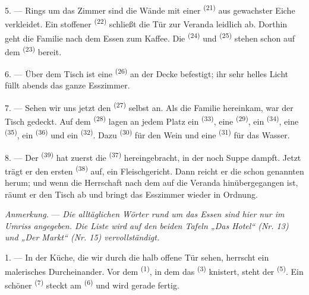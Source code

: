\VUsaut{4.6mm}
\VUsaut{3.0mm}

5. --- Rings um das Zimmer sind die Wände mit einer 
\textsuperscript{(21)} aus gewachster Eiche verkleidet. Ein stoffener
 \textsuperscript{(22)} schließt die Tür zur Veranda leidlich ab.
Dorthin geht die Familie nach dem Essen zum Kaffee. Die 
\textsuperscript{(24)} und  \textsuperscript{(25)} stehen schon
auf dem  \textsuperscript{(23)} bereit.

6. --- Über dem Tisch ist eine  \textsuperscript{(26)} an der
Decke befestigt; ihr sehr helles Licht füllt abends das ganze Esszimmer.

7. --- Sehen wir uns jetzt den  \textsuperscript{(27)} selbst an. Als
die Familie hereinkam, war der Tisch gedeckt. Auf dem 
\textsuperscript{(28)} lagen an jedem Platz ein 
\textsuperscript{(33)}, eine  \textsuperscript{(29)}, ein
 \textsuperscript{(34)}, eine  \textsuperscript{(35)},
ein  \textsuperscript{(36)} und ein 
\textsuperscript{(32)}. Dazu  \textsuperscript{(30)} für den Wein
und eine  \textsuperscript{(31)} für das Wasser.

8. --- Der  \textsuperscript{(39)} hat zuerst die
 \textsuperscript{(37)} hereingebracht, in der noch Suppe
dampft. Jetzt trägt er den ersten  \textsuperscript{(38)} auf, ein
Fleischgericht. Dann reicht er die schon genannten herum; und wenn die Herrschaft
nach dem  auf die Veranda hinübergegangen ist, räumt er den Tisch
ab und bringt das Esszimmer wieder in Ordnung.

\textit{Anmerkung.} --- \textit{Die alltäglichen Wörter rund um das Essen sind hier
nur im Umriss angegeben. Die Liste wird auf den beiden Tafeln „Das Hotel“ (Nr. 13)
und „Der Markt“ (Nr. 15) vervollständigt.}

\VUsaut{4.6mm}
\VUsaut{3.0mm}

1. --- In der Küche, die wir durch die halb offene Tür sehen, herrscht ein
malerisches Durcheinander. Vor dem  \textsuperscript{(1)}, in dem
das  \textsuperscript{(3)} knistert, steht der 
\textsuperscript{(5)}. Ein schöner  \textsuperscript{(7)} steckt am
 \textsuperscript{(6)} und wird gerade fertig.

